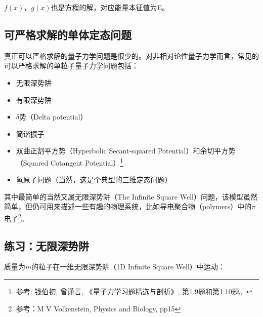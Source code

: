 $f(x)$，$g(x)$也是方程的解，对应能量本征值为E。

\subsection{可严格求解的单体定态问题}

真正可以严格求解的量子力学问题是很少的。对非相对论性量子力学而言，常见的可以严格求解的单粒子量子力学问题包括：

\begin{itemize}
  \item 无限深势阱
  \item 有限深势阱
  \item $\delta$势（Delta potential）
  \item 简谐振子
  \item 双曲正割平方势（Hyperbolic Secant-squared Potential）和余切平方势（Squared Cotangent
  Potential）\footnote{参考: 钱伯初, 曾谨言, 《量子力学习题精选与剖析》, 第1.9题和第1.10题。}
  \item 氢原子问题（当然，这是个典型的三维定态问题）
\end{itemize}

其中最简单的当然又属无限深势阱（The Infinite Square
Well）问题，该模型虽然简单，但仍可用来描述一些有趣的物理系统，比如导电聚合物（polymers）中的$\pi$电子\footnote{参考：M
V Volkenstein, Physics and Biology, pp15}。



\subsection{练习：无限深势阱}



质量为$m$的粒子在一维无限深势阱（1D Infinite Square Well）中运动：

